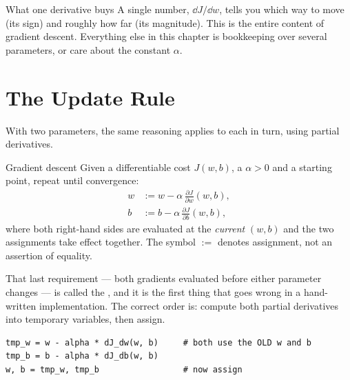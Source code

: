 \begin{keyinsight}{What one derivative buys}
A single number, $\dd J/\dd w$, tells you which way to move (its sign) and
roughly how far (its magnitude). This is the entire content of gradient descent.
Everything else in this chapter is bookkeeping over several parameters, or
care about the constant $\alpha$.
\end{keyinsight}

\section{The Update Rule}
\label{sec:update-rule}

With two parameters, the same reasoning applies to each in turn, using partial
derivatives.

\begin{defbox}{Gradient descent}
Given a differentiable cost $J(w,b)$, a  $\alpha>0$ and a
starting point, repeat until convergence:
\[
  \begin{aligned}
    w &:= w - \alpha\,\frac{\partial J}{\partial w}(w,b),\\[2pt]
    b &:= b - \alpha\,\frac{\partial J}{\partial b}(w,b),
  \end{aligned}
\]
where both right-hand sides are evaluated at the \emph{current} $(w,b)$ and the
two assignments take effect together. The symbol $:=$ denotes assignment, not
an assertion of equality.
\end{defbox}

That last requirement --- both gradients evaluated before either parameter
changes --- is called the , and it is the first thing
that goes wrong in a hand-written implementation. The correct order is: compute
both partial derivatives into temporary variables, then assign.

\begin{lstlisting}[style=pythonml,caption={Simultaneous update: compute both
gradients before assigning either parameter.}]
tmp_w = w - alpha * dJ_dw(w, b)     # both use the OLD w and b
tmp_b = b - alpha * dJ_db(w, b)
w, b = tmp_w, tmp_b                 # now assign
\end{lstlisting}

